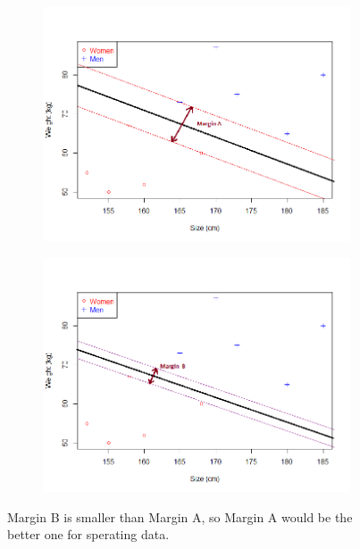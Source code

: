 \begin{figure}[h!]
	\centering
		\captionsetup{width=\textwidth}
	\centering
	\begin{subfigure}[b]{0.45\linewidth}
		\includegraphics[width=\linewidth]{images/svm/margin0.png}
	\end{subfigure}
	\begin{subfigure}[b]{0.45\linewidth}
		\includegraphics[width=\linewidth]{images/svm/margin1.png}
	\end{subfigure}
	\caption[The margin example]{Margin B is smaller than Margin A, so Margin A would be the better one for sperating data.}
\end{figure}

